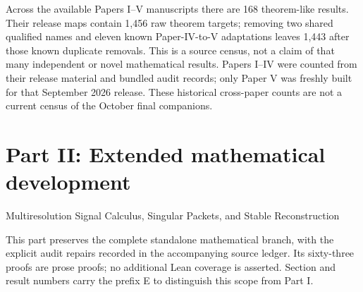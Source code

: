 \documentclass[11pt,letterpaper]{article}
\theoremstyle{plain}
\theoremstyle{plain}
\theoremstyle{plain}
\theoremstyle{definition}
\theoremstyle{definition}
\theoremstyle{definition}
\theoremstyle{definition}
\theoremstyle{remark}
\theoremstyle{remark}
\theoremstyle{remark}
\theoremstyle{remark}
\begin{document}
Across the available Papers I--V manuscripts there are 168 theorem-like results. Their release maps contain 1,456 raw theorem targets; removing two shared qualified names and eleven known Paper-IV-to-V adaptations leaves 1,443 after those known duplicate removals. This is a source census, not a claim of that many independent or novel mathematical results. Papers I--IV were counted from their release material and bundled audit records; only Paper V was freshly built for that September 2026 release. These historical cross-paper counts are not a current census of the October final companions.

\clearpage
\part*{Part II: Extended mathematical development}
\begin{center}\large Multiresolution Signal Calculus, Singular Packets, and Stable Reconstruction\end{center}
\noindent This part preserves the complete standalone mathematical branch, with the explicit audit repairs recorded in the accompanying source ledger. Its sixty-three proofs are prose proofs; no additional Lean coverage is asserted. Section and result numbers carry the prefix E to distinguish this scope from Part I.
\setcounter{section}{0}\setcounter{figure}{0}\setcounter{table}{0}
\renewcommand{\thesection}{E\arabic{section}}
\renewcommand{\theHsection}{extension.\arabic{section}}
\renewcommand{\thefigure}{E\arabic{figure}}
\renewcommand{\theHfigure}{extension.\arabic{figure}}
\renewcommand{\thetable}{E\arabic{table}}
\renewcommand{\theHtable}{extension.\arabic{table}}
\graphicspath{{extension_figures/}}

\begin{abstract}
Signals on a lattice admit exact coordinates indexed by the residue classes of every finite index sublattice. Convolution becomes a matrix of packet transfers, while filter banks and packet trees become exact changes of coordinates. We develop this structure on sequence spaces, prove quantitative stability for imperfect and perturbed banks, and give an exact dynamic recursion for adaptive packet trees. A singular signal is written as a smooth component plus step or truncated power packets that record jumps in the signal and its derivatives. Retaining the correct packets leaves only the smooth approximation error. Estimated packets are governed by exact formulas involving value error, region overlap, boundary displacement, and the norm of the smooth approximation operator. The main recovery result treats separated jumps sampled on a uniform grid. An explicit contrast gap gives exact recovery of every jump cell, grid scale location accuracy, amplitude control, and finite norm consistency. Probability bounds cover sub Gaussian noise and repeated measurements. Haar coefficients, two shifted grids, and annihilating differences give complementary localization results. The final sections treat Gibbs oscillation, nonlinear residue interactions, numerical illustrations, and cyclic Cayley coordinates.
\end{abstract}
\end{document}
